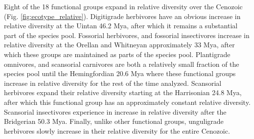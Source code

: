 \documentclass[12pt,letterpaper]{article}
\begin{document}
Eight of the 18 functional groups expand in relative diversity over the Cenozoic (Fig. \ref{fig:ecotype_relative}). Digitigrade herbivores have an obvious increase in relative diversity at the Uintan 46.2 Mya, after which it remains a substantial part of the species pool. Fossorial herbivores, and fossorial insectivores increase in relative diversity at the Orellan and Whitneyan approximately 33 Mya, after which these groups are maintained as parts of the species pool. Plantigrade omnivores, and scansorial carnivores are both a relatively small fraction of the species pool until the Hemingfordian 20.6 Mya where these functional groups increase in relative diversity for the rest of the time analyzed. Scansorial herbivores expand their relative diversity starting at the Harrisonian 24.8 Mya, after which this functional group has an approximately constant relative diversity. Scansorial insectivores experience in increase in relative diversity after the Bridgerian 50.3 Mya. Finally, unlike other functional groups, unguligrade herbivores slowly increase in their relative diversity for the entire Cenozoic.
\end{document}
